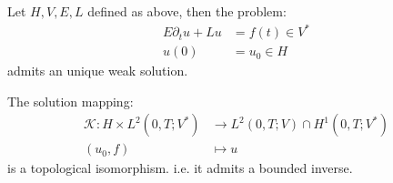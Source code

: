  


 
 \begin{theorem}
 		Let $H, V, E, L$ defined as above, then the problem:
 		\begin{align*}
 			E \partial_t u + Lu &= f(t) \in V^* \\
 			u(0) &= u_0 \in H
 		\end{align*}
 		admits an unique weak solution. 
 \end{theorem}
 \begin{remark}
 The solution mapping:
 \begin{align*}
 	\mathcal{K}: H \times L^2(0, T; V^*) &\rightarrow L^2(0,T; V) \cap H^1(0, T; V^*)\\
 	(u_0, f ) &\mapsto u
 \end{align*}	
 is a topological isomorphism. i.e. it admits a bounded inverse. 
 \end{remark}
